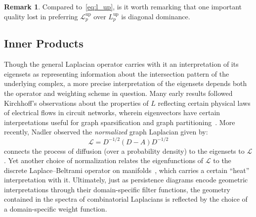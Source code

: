 \documentclass[10pt]{article}
\numberwithin{equation}{section}
\newcommand{\+}{%
	\raisebox{0.18ex}{\scaleobj{0.55}{+}}
}
\theoremstyle{definition}
\newtheorem{remark}{Remark}
\theoremstyle{definition}
\begin{document}
\begin{remark}
	Compared to~\eqref{eq:l_up}, is it worth remarking that one important quality lost in preferring $\mathcal{L}_p^{\text{up}}$ over $L_p^{\textrm{up}}$ is diagonal dominance. 
\end{remark}

\subsection*{Inner Products}\label{sec:inner_products}
Though the general Laplacian operator carries with it an interpretation of its eigensets as representing information about the intersection pattern of the underlying complex, a more precise interpretation of the eigensets depends both the operator and weighting scheme in question.
Many early results followed Kirchhoff's observations about the properties of $L$ reflecting certain physical laws of electrical flows in circuit networks, wherein eigenvectors have certain interpretations useful for graph sparsification and graph partitioning~\cite{chung1997spectral}. 
More recently, Nadler observed the \emph{normalized} graph Laplacian given by: 
\begin{equation}\label{eq:normal_graph_laplacian}
\mathcal{L} = D^{-1/2}(D - A) D^{-1/2}
\end{equation}
connects the process of diffusion (over a probability density) to the eigensets to $\mathcal{L}$.
Yet another choice of normalization relates the eigenfunctions of $\mathcal{L}$ to the discrete Laplace–Beltrami operator on manifolds~\cite{}, which carries a certain ``heat'' interpretation with it. 
Ultimately, just as persistence diagrams encode geometric interpretations through their domain-specific filter functions, the geometry contained in the spectra of combinatorial Laplacians is reflected by the choice of a domain-specific weight function.
\end{document}
